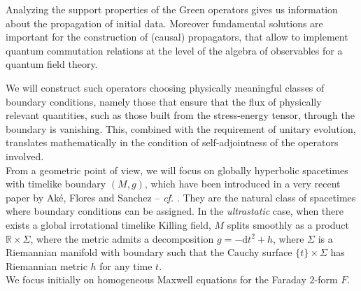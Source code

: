 Analyzing the support properties of the Green operators gives us information about the propagation of initial data. Moreover fundamental solutions are important for the construction of (causal) propagators, that allow to implement quantum commutation relations at the level of the algebra of observables for a quantum field theory.

We will construct such operators choosing physically meaningful classes of boundary conditions, namely those that ensure that the flux of physically relevant quantities, such as those built from the stress-energy tensor, through the boundary is vanishing. This, combined with the requirement of unitary evolution,  translates mathematically in the condition of self-adjointness of the operators involved.\\

From a geometric point of view, we will focus on {globally hyperbolic spacetimes} with timelike boundary $({M},g)$, which have been introduced in a very recent paper by Aké, Flores and Sanchez -- \emph{cf.} \cite{Ake-Flores-Sanchez-18}. They are the natural class of spacetimes where boundary conditions can be assigned.
In the \emph{ultrastatic} case, when there exists a global irrotational timelike Killing field, $M$ splits smoothly as a product $\mathbb{R}\times\Sigma$, where the metric admits a decomposition $g=-\mathrm{d} t^{2}+h$, where $\Sigma$ is a {Riemannian manifold} with boundary such that the Cauchy surface $\{t\} \times {\Sigma}$ has Riemannian metric $h$ for any time $t$.\\

We focus initially on homogeneous Maxwell equations for the Faraday $2$-form $F$.

